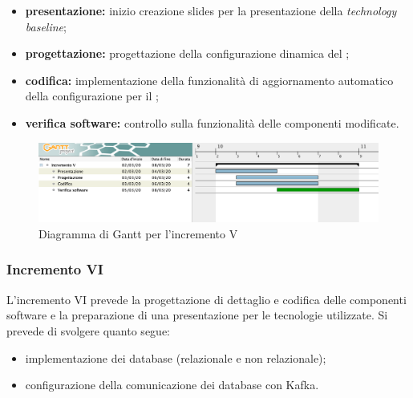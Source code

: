 					\begin{itemize}
						\item \textbf{presentazione:} inizio creazione slides per la presentazione della \textit{technology baseline};
						\item \textbf{progettazione:} progettazione della configurazione dinamica del ;
						\item \textbf{codifica:} implementazione della funzionalità di aggiornamento automatico della configurazione per il ;
						\item \textbf{verifica software:} controllo sulla funzionalità delle componenti modificate.
					\end{itemize} 			

		\begin{landscape}
          \begin{figure}[H]
            \centering
            \includegraphics[width=\linewidth]{images/gantt/incrementoV} %
            \caption{Diagramma di Gantt per l'incremento V}
          \end{figure}		
		\end{landscape}


		\subsubsection{Incremento VI}
			
			L'incremento VI prevede la progettazione di dettaglio e codifica delle componenti software e la preparazione di una presentazione per le tecnologie utilizzate. Si prevede di svolgere quanto segue:
			\begin{itemize}
				\item implementazione dei database (relazionale e non relazionale);
				\item configurazione della comunicazione dei database con Kafka.
			\end{itemize}
			
